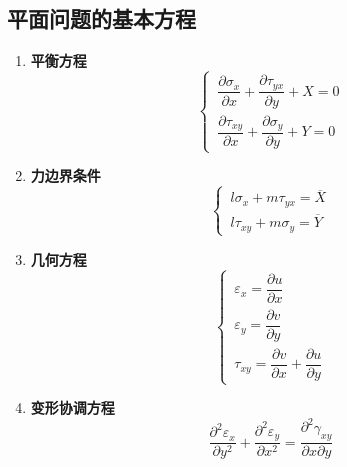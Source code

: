 \documentclass[10pt,a4]{article}
\numberwithin{equation}{section}
\begin{document}
	\subsection{平面问题的基本方程}
	\begin{enumerate}
		\item \textbf{平衡方程}
		\begin{equation}
			\begin{cases}
				\, \dfrac{\partial \sigma_x }{\partial x} + \dfrac{\partial \tau_{yx}}{\partial y}  + X = 0\\[0.7em]
				\, \dfrac{\partial \tau_{xy} }{\partial x} + \dfrac{\partial \sigma_{y}}{\partial y} + Y = 0
			\end{cases}
			\label{平面平衡方程}
		\end{equation}
		
		\item \textbf{力边界条件}
		\begin{equation}
			\begin{cases}
				\, l \sigma_x + m\tau_{yx} = \overline{X} \\
				\, l \tau_{xy} + m \sigma_y = \overline{Y} 
			\end{cases}
		\end{equation}
		
		\item \textbf{几何方程}
		\begin{equation}
			\begin{cases}
				\, \varepsilon_x = \dfrac{\partial u}{\partial x}\\[0.7em]
				\, \varepsilon_y = \dfrac{\partial v}{\partial y} \\[0.7em]
				\, \tau_{xy} = \dfrac{\partial v}{\partial x} + \dfrac{\partial u}{\partial y}
			\end{cases}
			\label{平面几何方程}
		\end{equation}
		
		\item \textbf{变形协调方程}
		\begin{equation}
			\dfrac{\partial^2 \varepsilon_x}{\partial y^2} + \dfrac{\partial^2 \varepsilon_y}{\partial x^2} = \dfrac{\partial^2 \gamma_{xy}}{\partial x \partial y}
			\label{平面协调方程}
		\end{equation}
	\end{enumerate}
	
\end{document}

